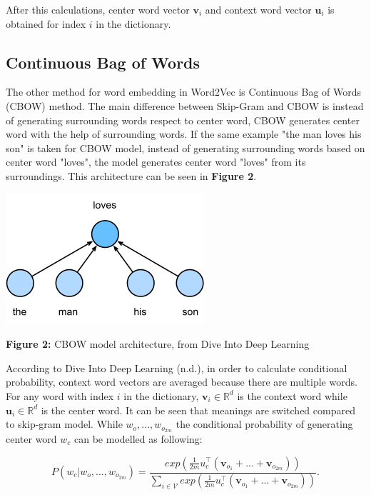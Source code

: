 \documentclass[man]{apa7}
\begin{document}
After this calculations, center word vector $\mathbf{v}_i$ and context word vector $\mathbf{u}_i$ is obtained for index $i$ in the dictionary.

\subsection{Continuous Bag of Words}
The other method for word embedding in Word2Vec is Continuous Bag of Words (CBOW) method. The main difference between Skip-Gram and CBOW is instead of generating surrounding words respect to center word, CBOW generates center word with the help of surrounding words. If the same example "the man loves his son" is taken for CBOW model, instead of generating surrounding words based on center word "loves", the model generates center word "loves" from its surroundings. This architecture can be seen in \textbf{Figure 2}.
\\[2\baselineskip]

\begin{center}
\includegraphics[scale=1]{cbow.png}

\textbf{Figure 2:} CBOW model architecture, from Dive Into Deep Learning\\[2\baselineskip]

\end{center}

According to Dive Into Deep Learning (n.d.), in order to calculate conditional probability, context word vectors are averaged because there are multiple words. For any word with index $i$ in the dictionary, $\mathbf{v_\mathit{i}} \in \mathbb{R}^d$ is the context word while $\mathbf{u_\mathit{i}} \in \mathbb{R}^d$  is the center word. It can be seen that meanings are switched compared to skip-gram model. While $w_o,...,w_{o_{2m}}$ the conditional probability of generating center word $w_c$ can be modelled as following:

\begin{equation}
P(w_c|w_o,...,w_{o_{2m}}) = \frac{exp(\frac{1}{2m}u_c^\top(\mathbf{v}_{o_1}+...+\mathbf{v}_{o_{2m}}))}{\sum_{i \in \mathcal{V}} exp(\frac{1}{2m}u_c^\top(\mathbf{v}_{o_1}+...+\mathbf{v}_{o_{2m}}))}.
\end{equation}
\end{document}
